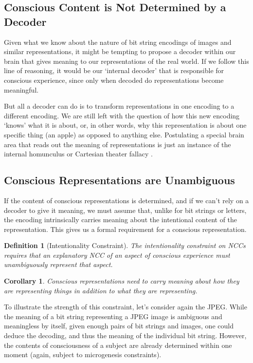 \documentclass[11pt]{article}
\newtheorem{definition}{Definition}
\newtheorem{corollary}{Corollary}
\begin{document}
\subsection{Conscious Content is Not Determined by a Decoder}

Given what we know about the nature of bit string encodings of images and similar representations, it might be tempting to propose a decoder within our brain that gives meaning to our representations of the real world. If we follow this line of reasoning, it would be our `internal decoder' that is responsible for conscious experience, since only when decoded do representations become meaningful.

But all a decoder can do is to transform representations in one encoding to a different encoding. We are still left with the question of how this new encoding `knows' what it is about, or, in other words, why this representation is about one specific thing (an apple) as opposed to anything else. Postulating a special brain area that reads out the meaning of representations is just an instance of the internal homunculus or Cartesian theater fallacy \cite{pennartz2022}.

\subsection{Conscious Representations are Unambiguous}

If the content of conscious representations is determined, and if we can't rely on a decoder to give it meaning, we must assume that, unlike for bit strings or letters, the encoding intrinsically carries meaning about the intentional content of the representation. This gives us a formal requirement for a conscious representation.

\begin{definition}[Intentionality Constraint]
The intentionality constraint on NCCs requires that an explanatory NCC of an aspect of conscious experience must unambiguously represent that aspect.
\end{definition}

\begin{corollary}
Conscious representations need to carry meaning about how they are representing things in addition to what they are representing.
\end{corollary}

To illustrate the strength of this constraint, let's consider again the JPEG. While the meaning of a bit string representing a JPEG image is ambiguous and meaningless by itself, given enough pairs of bit strings and images, one could deduce the decoding, and thus the meaning of the individual bit string. However, the contents of consciousness of a subject are already determined within one moment (again, subject to microgenesis constraints).
\end{document}

